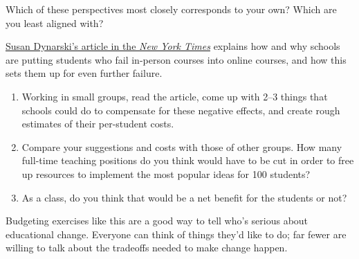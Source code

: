 \noindent
Which of these perspectives most closely corresponds to your own?
Which are you least aligned with?


\href{https://www.nytimes.com/2018/01/19/business/online-courses-are-harming-the-students-who-need-the-most-help.html}{Susan
  Dynarski's article in the \emph{New York Times}} explains how and
why schools are putting students who fail in-person courses into
online courses, and how this sets them up for even further
failure.

\begin{enumerate}

\item Working in small groups, read the article, come up with 2--3
  things that schools could do to compensate for these negative
  effects, and create rough estimates of their per-student costs.

\item Compare your suggestions and costs with those of other groups.
  How many full-time teaching positions do you think would have to be
  cut in order to free up resources to implement the most popular
  ideas for 100 students?

\item As a class, do you think that would be a net benefit for the
  students or not?

\end{enumerate}

\noindent
Budgeting exercises like this are a good way to tell who's serious
about educational change.  Everyone can think of things they'd like to
do; far fewer are willing to talk about the tradeoffs needed to make
change happen.
